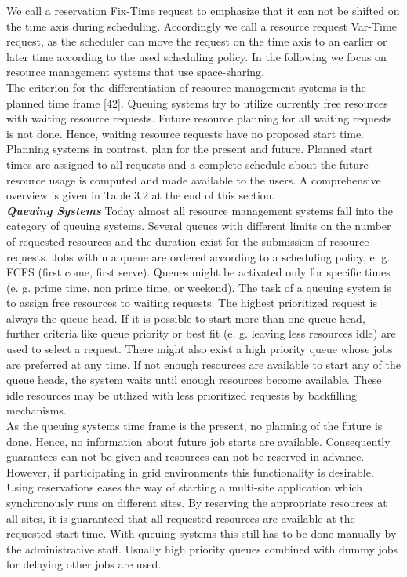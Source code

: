 We call a reservation Fix-Time request to emphasize that it can not be shifted on the time axis during scheduling. Accordingly we call a resource request Var-Time request, as the scheduler can move the request on the time axis to an earlier or later time according to the used scheduling policy. In the following we focus on resource management systems that use space-sharing.\\

The criterion for the differentiation of resource management systems is the planned time frame [42]. Queuing systems try to utilize currently free resources with waiting resource requests. Future resource planning for all waiting requests is not done. Hence, waiting resource requests have no proposed start time. Planning systems in contrast, plan for the present and future. Planned start times are assigned to all requests and a complete schedule about the future resource usage is computed and made available to the users. A comprehensive overview is given in Table 3.2 at the end of this section.\\

\textbf{\textit{Queuing Systems }}Today almost all resource management systems fall into the category of queuing systems. Several queues with different limits on the number of requested resources and the duration exist for the submission of resource requests. Jobs within a queue are ordered according to a scheduling policy, e. g. FCFS (first come, first serve). Queues might be activated only for specific times (e. g. prime time, non prime time, or weekend). The task of a queuing system is to assign free resources to waiting requests. The highest prioritized request is always the queue head. If it is possible to start more than one queue head, further criteria like queue priority or best fit (e. g. leaving less resources idle) are used to select a request. There might also exist a high priority queue whose jobs are preferred at any time. If not enough resources are available to start any of the queue heads, the system waits until enough resources become available. These idle resources may be utilized with less prioritized requests by backfilling mechanisms.\\

As the queuing systems time frame is the present, no planning of the future is done. Hence, no information about future job starts are available. Consequently guarantees can not be given and resources can not be reserved in advance. However, if participating in grid environments this functionality is desirable. Using reservations eases the way of starting a multi-site application which synchronously runs on different sites. By reserving the appropriate resources at all sites, it is guaranteed that all requested resources are available at the requested start time. With queuing systems this still has to be done manually by the administrative staff. Usually high priority queues combined with dummy jobs for delaying other jobs are used.\\

